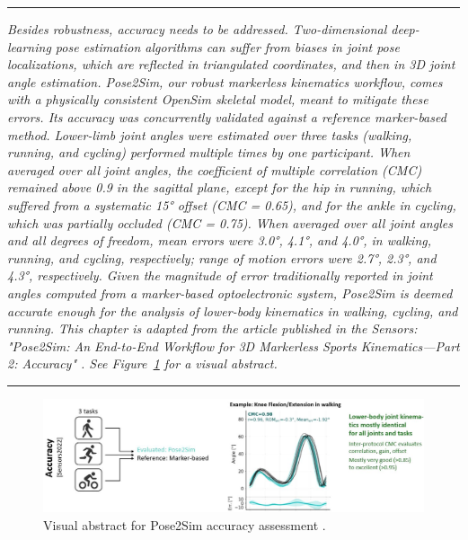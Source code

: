 \begin{center}
\rule{0.7\linewidth}{.5pt}
\begin{minipage}{0.7\linewidth}
\smallskip

\textit{Besides robustness, accuracy needs to be addressed. Two-dimensional deep-learning pose estimation algorithms can suffer from biases in joint pose localizations, which are reflected in triangulated coordinates, and then in 3D joint angle estimation. Pose2Sim, our robust markerless kinematics workflow, comes with a physically consistent OpenSim skeletal model, meant to mitigate these errors. \newline\newline
Its accuracy was concurrently validated against a reference marker-based method. Lower-limb joint angles were estimated over three tasks (walking, running, and cycling) performed multiple times by one participant. When averaged over all joint angles, the coefficient of multiple correlation (CMC) remained above 0.9 in the sagittal plane, except for the hip in running, which suffered from a systematic 15° offset (CMC = 0.65), and for the ankle in cycling, which was partially occluded (CMC = 0.75). When averaged over all joint angles and all degrees of freedom, mean errors were 3.0°, 4.1°, and 4.0°, in walking, running, and cycling, respectively; range of motion errors were 2.7°, 2.3°, and 4.3°, respectively. Given the magnitude of error traditionally reported in joint angles computed from a marker-based optoelectronic system, Pose2Sim is deemed accurate enough for the analysis of lower-body kinematics in walking, cycling, and running.\newline\newline
This chapter is adapted from the article published in the Sensors: "Pose2Sim: An End-to-End Workflow for 3D Markerless Sports Kinematics—Part 2: Accuracy" \cite{Pagnon2022a}. See Figure~\ref{fig_visabstract3} for a visual abstract.
}

\end{minipage}
\smallskip
\rule{0.7\linewidth}{.5pt}
\end{center}

\pagebreak
\minitoc

\vspace*{3cm}

\begin{figure}[hbtp]
	\centering
	\def\svgwidth{1\columnwidth}
	\fontsize{10pt}{10pt}\selectfont
	\includegraphics[width=\linewidth]{"../Intro/Figures/Fig_VisAbstract3.JPG"}
      \caption{Visual abstract for Pose2Sim accuracy assessment \cite{Pagnon2022a}.}
	\label{fig_visabstract3}
\end{figure}

